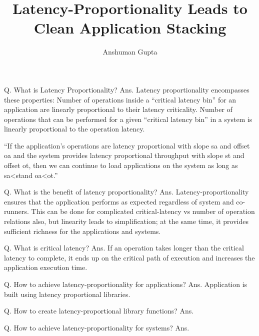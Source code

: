 \documentclass[10pt,letter,twocolumn]{article}
\begin{document}
\title{Latency-Proportionality Leads to Clean Application Stacking}
\author{Anshuman Gupta}
\date{}

\maketitle

Q. What is Latency Proportionality?
Ans. Latency proportionality encompasses these properties:
Number of operations inside a “critical latency bin” for an application are linearly proportional to their latency criticality.
Number of operations that can be performed for a given “critical latency bin” in a system is linearly proportional to the operation latency.

“If the application’s operations are latency proportional with slope sa and offset oa and the system provides latency proportional throughput with slope st and offset ot, then we can continue to load applications on the system as long as sa<stand oa<ot.”

Q. What is the benefit of latency proportionality?
Ans. Latency-proportionality ensures that the application performs as expected regardless of system and co-runners. This can be done for complicated critical-latency vs number of operation relations also, but linearity leads to simplification; at the same time, it provides sufficient richness for the applications and systems.

Q. What is critical latency?
Ans. If an operation takes longer than the critical latency to complete, it ends up on the critical path of execution and increases the application execution time.

Q. How to achieve latency-proportionality for applications?
Ans. Application is built using latency proportional libraries.

Q. How to create latency-proportional library functions?
Ans. 

Q. How to achieve latency-proportionality for systems?
Ans. 
\end{document}
